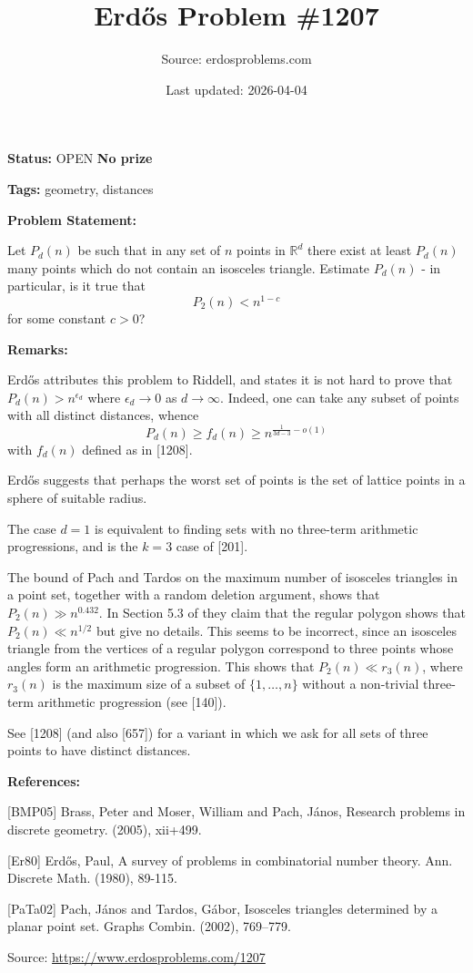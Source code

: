 \documentclass{article}
\title{Erd\H{o}s Problem \#1207}
\date{Last updated: 2026-04-04}
\author{Source: erdosproblems.com}
\begin{document}
\maketitle

\noindent\textbf{Status:} OPEN \quad \textbf{No prize}

\noindent\textbf{Tags:} geometry, distances

\medskip
\noindent\textbf{Problem Statement:}

Let $P_d(n)$ be such that in any set of $n$ points in $\mathbb{R}^d$ there exist at least $P_d(n)$ many points which do not contain an isosceles triangle. Estimate $P_d(n)$ - in particular, is it true that\[P_2(n)<n^{1-c}\]for some constant $c>0$?

\bigskip
\noindent\textbf{Remarks:}

Erd\H{o}s \cite{Er80} attributes this problem to Riddell, and states it is not hard to prove that $P_d(n)>n^{\epsilon_d}$ where $\epsilon_d\to 0$ as $d\to \infty$. Indeed, one can take any subset of points with all distinct distances, whence\[P_d(n)\geq f_d(n) \geq n^{\frac{1}{3d-3}-o(1)}\]with $f_d(n)$ defined as in [1208].

Erd\H{o}s suggests that perhaps the worst set of points is the set of lattice points in a sphere of suitable radius.

The case $d=1$ is equivalent to finding sets with no three-term arithmetic progressions, and is the $k=3$ case of [201]. 

The bound of Pach and Tardos \cite{PaTa02} on the maximum number of isosceles triangles in a point set, together with a random deletion argument, shows that $P_2(n) \gg n^{0.432}$. In Section 5.3 of \cite{BMP05} they claim that the regular polygon shows that $P_2(n) \ll n^{1/2}$ but give no details. This seems to be incorrect, since an isosceles triangle from the vertices of a regular polygon correspond to three points whose angles form an arithmetic progression. This shows that $P_2(n)\ll r_3(n)$, where $r_3(n)$ is the maximum size of a subset of $\{1,\ldots,n\}$ without a non-trivial three-term arithmetic progression (see [140]).

See [1208] (and also [657]) for a variant in which we ask for all sets of three points to have distinct distances.

\bigskip
\noindent\textbf{References:}

[BMP05] Brass, Peter and Moser, William and Pach, J\'{a}nos, Research problems in discrete geometry. (2005), xii+499.
 
 [Er80] Erd\H{o}s, Paul, A survey of problems in combinatorial number theory. Ann. Discrete Math. (1980), 89-115.
 
 [PaTa02] Pach, J\'{a}nos and Tardos, G\'{a}bor, Isosceles triangles determined by a planar point set. Graphs Combin. (2002), 769--779.

\bigskip
\noindent\small{Source: \url{https://www.erdosproblems.com/1207}}
\end{document}
